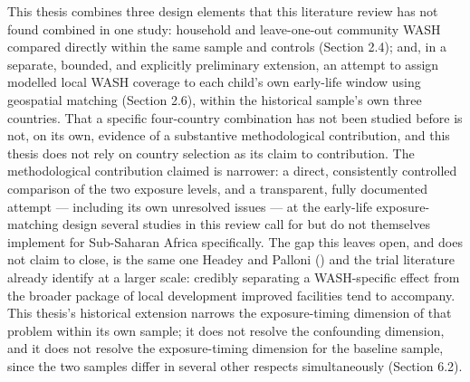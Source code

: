 This thesis combines three design elements that this literature review has not found combined in one study: household and leave-one-out community WASH compared directly within the same sample and controls (Section 2.4); and, in a separate, bounded, and explicitly preliminary extension, an attempt to assign modelled local WASH coverage to each child's own early-life window using geospatial matching (Section 2.6), within the historical sample's own three countries. That a specific four-country combination has not been studied before is not, on its own, evidence of a substantive methodological contribution, and this thesis does not rely on country selection as its claim to contribution. The methodological contribution claimed is narrower: a direct, consistently controlled comparison of the two exposure levels, and a transparent, fully documented attempt --- including its own unresolved issues --- at the early-life exposure-matching design several studies in this review \parencite{Donohue2023,SkoufiasVinha2026} call for but do not themselves implement for Sub-Saharan Africa specifically. The gap this leaves open, and does not claim to close, is the same one Headey and Palloni (\citeyear{HeadeyPalloni2019}) and the trial literature \parencite{Cumming2019} already identify at a larger scale: credibly separating a WASH-specific effect from the broader package of local development improved facilities tend to accompany. This thesis's historical extension narrows the exposure-timing dimension of that problem within its own sample; it does not resolve the confounding dimension, and it does not resolve the exposure-timing dimension for the baseline sample, since the two samples differ in several other respects simultaneously (Section 6.2).

